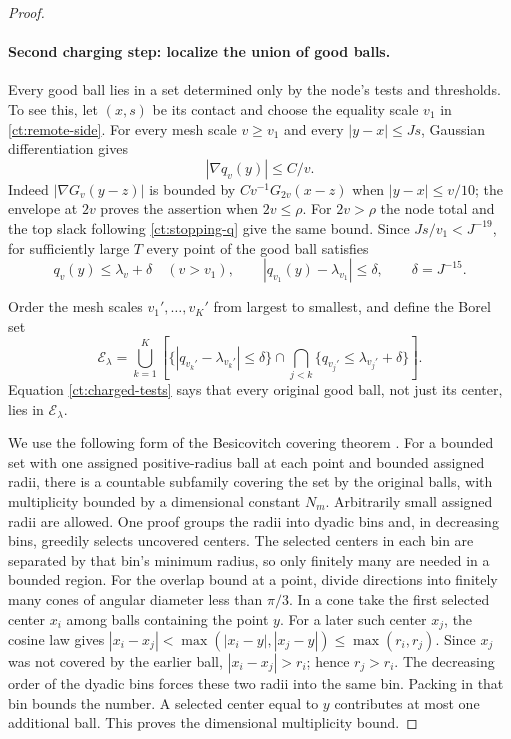 \begin{proof}
\paragraph{Second charging step: localize the union of good balls.}
Every good ball lies in a set determined only by the node's tests and
thresholds.  To see this, let $(x,s)$ be its contact and choose the
equality scale $v_1$ in \eqref{ct:remote-side}.  For every mesh scale
$v\ge v_1$ and every $|y-x|\le Js$, Gaussian differentiation gives
\begin{equation}\label{ct:q-gradient}
 |\nabla q_v(y)|\le C/v.
\end{equation}
Indeed $|\nabla G_v(y-z)|$ is bounded by
$Cv^{-1}G_{2v}(x-z)$ when $|y-x|\le v/10$; the envelope at $2v$
proves the assertion when $2v\le\rho$.  For $2v>\rho$ the node total
and the top slack following \eqref{ct:stopping-q} give the same bound.
Since $Js/v_1<J^{-19}$, for sufficiently large $T$ every point of
the good ball satisfies
\begin{equation}\label{ct:charged-tests}
 q_v(y)\le\lambda_v+\delta\quad(v>v_1),\qquad
 |q_{v_1}(y)-\lambda_{v_1}|\le\delta,
 \qquad\delta=J^{-15}.
\end{equation}

Order the mesh scales $v_1',\ldots,v_K'$ from largest to smallest,
and define the Borel set
\begin{equation}\label{ct:threshold-event}
 \mathcal E_\lambda=
 \bigcup_{k=1}^K\left[
  \{|q_{v_k'}-\lambda_{v_k'}|\le\delta\}
  \cap\bigcap_{j<k}\{q_{v_j'}\le\lambda_{v_j'}+\delta\}
                    \right].
\end{equation}
Equation \eqref{ct:charged-tests} says that every original good ball,
not just its center, lies in $\mathcal E_\lambda$.

We use the following form of the Besicovitch covering theorem
\cite[Chapter~1, Lemma~4.5]{Simon2018}.
For a bounded set with one assigned positive-radius ball at each
point and bounded assigned radii, there is a countable subfamily
covering the set by the original balls, with multiplicity bounded by
a dimensional constant $N_m$.  Arbitrarily small assigned radii are
allowed.  One proof groups the radii into dyadic bins and, in decreasing
bins, greedily selects uncovered centers.  The selected centers in
each bin are separated by that bin's minimum radius, so only finitely
many are needed in a bounded region.  For the overlap bound at a point,
divide directions into finitely many cones of angular diameter less
than $\pi/3$.  In a cone take the first selected center $x_i$ among
balls containing the point $y$.  For a later such center $x_j$, the
cosine law gives
$|x_i-x_j|<\max(|x_i-y|,|x_j-y|)\le\max(r_i,r_j)$.
Since $x_j$ was not covered by the earlier ball, $|x_i-x_j|>r_i$;
hence $r_j>r_i$.  The decreasing order of the dyadic bins forces
these two radii into the same bin.  Packing in that bin bounds the
number.  A selected center equal to $y$ contributes at most one
additional ball.  This proves the dimensional multiplicity bound.


\end{proof}

